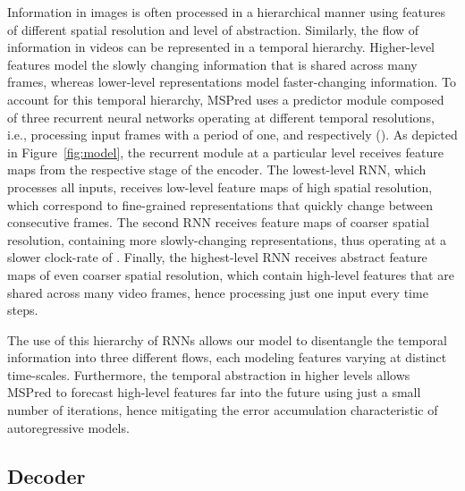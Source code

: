 \documentclass{bmvc2k}
\newcommand{\Figure}[1]{Figure~\ref{#1}}
\begin{document}
Information in images is often processed in a hierarchical manner using features of different spatial resolution and level of abstraction.
Similarly, the flow of information in videos can be represented in a temporal hierarchy. Higher-level features model the slowly changing information that is shared across many frames, whereas lower-level representations model faster-changing information.
To account for this temporal hierarchy, MSPred uses a predictor module composed of three recurrent neural networks operating at different temporal resolutions, i.e., processing input frames with a period of one,  and  respectively ().
As depicted in \Figure{fig:model}, the recurrent module at a particular level receives feature maps from the respective stage of the encoder.
The lowest-level RNN, which processes all inputs, receives low-level feature maps of high spatial resolution, which correspond to fine-grained representations that quickly change between consecutive frames.
The second RNN receives feature maps of coarser spatial resolution, containing more slowly-changing representations, thus operating at a slower clock-rate of .
Finally, the highest-level RNN receives abstract feature maps of even coarser spatial resolution, which contain high-level features that are shared across many video frames, hence processing just one input every  time steps.

The use of this hierarchy of RNNs allows our model to disentangle the temporal information into three different flows, each modeling features varying at distinct time-scales.
Furthermore, the temporal abstraction in higher levels allows MSPred to forecast high-level features far into the future using just a small number of iterations, hence mitigating the error accumulation characteristic of autoregressive models.


\subsection{Decoder}
\label{section: decoder}
\end{document}
